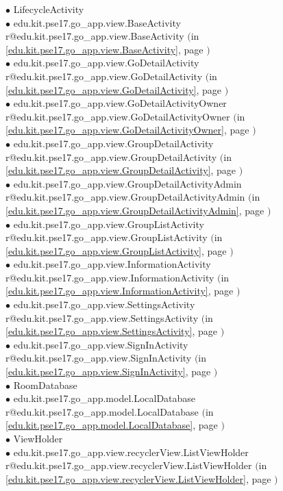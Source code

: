 \documentclass[11pt,a4paper]{report}
\makeatletter
\newcommand{\refdefined}[1]{
\expandafter\ifx\csname r@#1\endcsname\relax
\relax\else
{$($in \ref{#1}, page \pageref{#1}$)$}\fi}
\makeatother
\begin{document}
{{\hspace{1.0cm} $\bullet$ LifecycleActivity {\tiny } \\
\hspace{2.0cm} $\bullet$ edu.kit.pse17.go\_app.view.BaseActivity {\tiny \refdefined{edu.kit.pse17.go_app.view.BaseActivity}} \\
\hspace{3.0cm} $\bullet$ edu.kit.pse17.go\_app.view.GoDetailActivity {\tiny \refdefined{edu.kit.pse17.go_app.view.GoDetailActivity}} \\
\hspace{4.0cm} $\bullet$ edu.kit.pse17.go\_app.view.GoDetailActivityOwner {\tiny \refdefined{edu.kit.pse17.go_app.view.GoDetailActivityOwner}} \\
\hspace{3.0cm} $\bullet$ edu.kit.pse17.go\_app.view.GroupDetailActivity {\tiny \refdefined{edu.kit.pse17.go_app.view.GroupDetailActivity}} \\
\hspace{4.0cm} $\bullet$ edu.kit.pse17.go\_app.view.GroupDetailActivityAdmin {\tiny \refdefined{edu.kit.pse17.go_app.view.GroupDetailActivityAdmin}} \\
\hspace{3.0cm} $\bullet$ edu.kit.pse17.go\_app.view.GroupListActivity {\tiny \refdefined{edu.kit.pse17.go_app.view.GroupListActivity}} \\
\hspace{3.0cm} $\bullet$ edu.kit.pse17.go\_app.view.InformationActivity {\tiny \refdefined{edu.kit.pse17.go_app.view.InformationActivity}} \\
\hspace{3.0cm} $\bullet$ edu.kit.pse17.go\_app.view.SettingsActivity {\tiny \refdefined{edu.kit.pse17.go_app.view.SettingsActivity}} \\
\hspace{3.0cm} $\bullet$ edu.kit.pse17.go\_app.view.SignInActivity {\tiny \refdefined{edu.kit.pse17.go_app.view.SignInActivity}} \\
\hspace{1.0cm} $\bullet$ RoomDatabase {\tiny } \\
\hspace{2.0cm} $\bullet$ edu.kit.pse17.go\_app.model.LocalDatabase {\tiny \refdefined{edu.kit.pse17.go_app.model.LocalDatabase}} \\
\hspace{1.0cm} $\bullet$ ViewHolder {\tiny } \\
\hspace{2.0cm} $\bullet$ edu.kit.pse17.go\_app.view.recyclerView.ListViewHolder {\tiny \refdefined{edu.kit.pse17.go_app.view.recyclerView.ListViewHolder}} \\
}}
\end{document}
